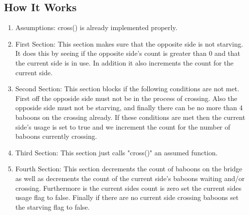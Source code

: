 \documentclass[]{article}
\begin{document}
\subsection{How It Works}
\begin{enumerate}
\item Assumptions: cross() is already implemented properly.

\item First Section: This section makes sure that the opposite
side is not starving. It does this by seeing if the opposite
side's count is greater than 0 and that the current side is
in use. In addition it also increments the count for the
current side.

\item Second Section: This section blocks if the following
conditions are not met. First off the opposide side must not be
in the process of crossing. Also the opposide side must not be
starving, and finally there can be no more than 4 baboons on the
crossing already. If these conditions are met then the current side's
usage is set to true and we increment the count for the number
of baboons currently crossing.

\item Third Section: This section just calls "cross()" an 
assumed function.

\item Fourth Section: This section decrements the count of
baboons on the bridge as well as decrements the count of the 
current side's baboons waiting and/or crossing. Furthermore 
is the current sides count is zero set the current sides usage
flag to false. Finally if there are no current side crossing baboons
set the starving flag to false.
\end{enumerate}
\end{document}
